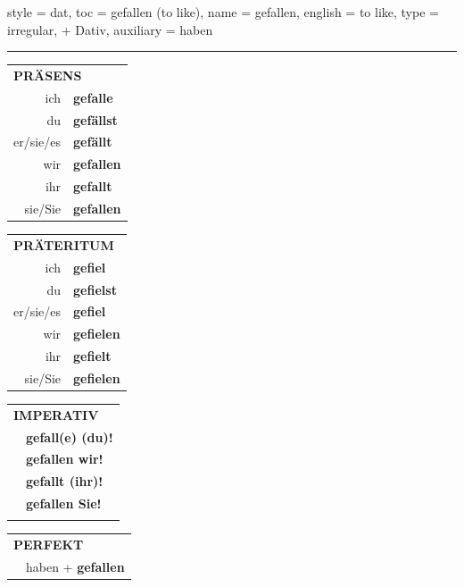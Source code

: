 \begin{verbentry}{
  style = {dat},
  toc = {gefallen (to like)},
  name = {gefallen},
  english = {to like},
  type = {irregular, + Dativ},
  auxiliary = {haben}
}
 
    
     \vspace{5pt}

    \hrule
    
    \vspace{5pt}

  \begin{tabular}{rl}
     \multicolumn{2}{l}{\textbf{PRÄSENS} }\\
    ich & \textbf{gefalle}\\
    du & \textbf{gefällst}\\
    er/sie/es & \textbf{gefällt}\\
    wir & \textbf{gefallen}\\
    ihr & \textbf{gefallt}\\
    sie/Sie & \textbf{gefallen}\\
  \end{tabular}
  \hfill
     \begin{tabular}{rl}
    \multicolumn{2}{l}{\textbf{PRÄTERITUM} }\\
    ich & \textbf{gefiel}\\
    du & \textbf{gefielst}\\
    er/sie/es & \textbf{gefiel}\\
    wir & \textbf{gefielen}\\
    ihr & \textbf{gefielt}\\
    sie/Sie & \textbf{gefielen}\\
  \end{tabular}
  \hfill
  \begin{tabular}{rl}
     \multicolumn{2}{l}{\textbf{IMPERATIV} }\\
   & \textbf{gefall(e) (du)!}\\
   & \textbf{gefallen wir!}\\
   & \textbf{gefallt (ihr)!}\\
   & \textbf{gefallen Sie!}\\
   & \vspace{10pt}
  \end{tabular}

    \vspace{10pt}

 \begin{tabular}{rl}
     \multicolumn{2}{l}{\textbf{PERFEKT}}\\
  &  haben + \textbf{gefallen}\\
  \end{tabular}
\hfill
   \begin{tabular}{rl}
   

\end{tabular}
\end{verbentry}
